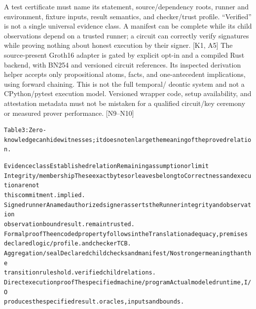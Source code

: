 \documentclass{article}
\begin{document}
A test certificate must name its statement, source/dependency roots, runner and environment, fixture
inputs, result semantics, and checker/trust profile. “Verified” is not a single universal evidence class.
A manifest can be complete while its child observations depend on a trusted runner; a circuit can
correctly verify signatures while proving nothing about honest execution by their signer. [K1, A5]
The source-present Groth16 adapter is gated by explicit opt-in and a compiled Rust backend, with
BN254 and versioned circuit references. Its inspected derivation helper accepts only propositional
atoms, facts, and one-antecedent implications, using forward chaining. This is not the full temporal/
deontic system and not a CPython/pytest execution model. Versioned wrapper code, setup availability,
and attestation metadata must not be mistaken for a qualified circuit/key ceremony or measured
prover performance. [N9–N10]


\begingroup\fontsize{7}{8.4}\selectfont
\begin{alltt}
Table 3: Zero-knowledge can hide witnesses; it does not enlarge the meaning of the proved relation.
\end{alltt}\endgroup

\begingroup\fontsize{7}{8.4}\selectfont
\begin{alltt}
Evidence class            Established relation                       Remaining assumption or limit
Integrity / membership    These exact bytes or leaves belong to      Correctness and execution are not
                          this commitment.                           implied.
Signed runner             A named authorized signer asserts the      Runner integrity and observation
observation               bound result.                              remain trusted.
Formal proof              The encoded property follows in the        Translation adequacy, premises
                          declared logic/profile.                    and checker TCB.
Aggregation / seal        Declared child checks and manifest/        No stronger meaning than the
                          transition rules hold.                     verified child relations.
Direct execution proof    The specified machine/program              Actual modeled runtime, I/O
                          produces the specified result.             oracles, inputs and bounds.
\end{alltt}\endgroup
\end{document}
